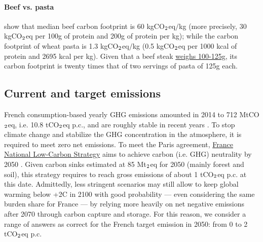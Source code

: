 \documentclass[english,5p,authoryear]{elsarticle}
\begin{document}
\begin{appendices}
\paragraph{Beef vs. pasta}

\citet{poore_reducing_2018} show that median beef carbon footprint is 60 kgCO$_\textnormal{2}$eq$/$kg (more precisely, 30 kgCO$_\textnormal{2}$eq per 100g of protein and 200g of protein per kg); while the carbon footprint of wheat pasta is 1.3 kgCO$_\textnormal{2}$eq$/$kg (0.5 kgCO$_\textnormal{2}$eq per 1000 kcal of protein and 2695 kcal per kg). Given that a beef steak \href{http://www.lessentieldesviandes-pro.org/introduction.php}{weighs 100-125g}, its carbon footprint is twenty times that of two servings of pasta of 125g each. 

\subsection{Current and target emissions\label{app:emission}}

French consumption-based yearly GHG emissions amounted in 2014 to 712 MtCO$_\textnormal{2}$eq, i.e. 10.8 tCO$_\textnormal{2}$eq p.c., and are roughly stable in recent years \citep{cgdd_chiffres_2019}. To stop climate change and stabilize the GHG concentration in the atmosphere, it is required to meet zero net emissions. To meet the Paris agreement,  \href{https://www.ecologique-solidaire.gouv.fr/strategie-nationale-bas-carbone-snbc}{France National Low-Carbon Strategy} aims to achieve carbon (i.e. GHG) neutrality by 2050 \citep{ministry_of_ecology_france_2015}. Given carbon sinks estimated at 85 Mt$_\textnormal{2}$eq for 2050 (mainly forest and soil), this strategy requires to reach gross emissions of about 1 tCO$_\textnormal{2}$eq p.c. at this date. Admittedly, less stringent scenarios may still allow to keep global warming below +2\textdegree{}C in 2100 with good probability --- even considering the same burden share for France --- by relying more heavily on net negative emissions after 2070 through carbon capture and storage. For this reason, we consider a range of answers as correct for the French target emission in 2050: from 0 to 2 tCO$_\textnormal{2}$eq p.c.



\end{appendices}
\end{document}
